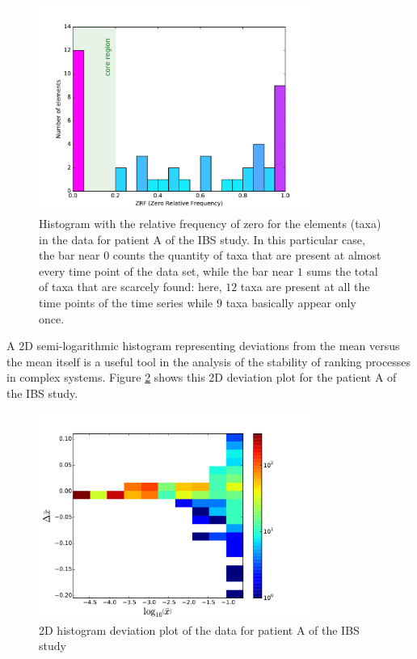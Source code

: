 \begin{figure}
	\centering
	\includegraphics[width=0.8\textwidth]{results/hist/IBS_h_A_amplicons_family_ZRFhist.pdf}
	\caption{Histogram with the relative frequency of zero for the elements (taxa) in the data for patient A of the IBS study\cite{IBS}. In this particular case, the bar near $0$ counts the quantity of taxa that are present at almost every time point of the data set, while the bar near $1$ sums the total of taxa that are scarcely found: here, $12$ taxa are present at all the time points of the time series while $9$ taxa basically appear only once.}
	\label{fig:histZRF}
\end{figure}

A 2D semi-logarithmic histogram representing deviations from the mean versus the mean itself is a useful tool in the analysis of the stability of ranking processes in complex systems\cite{ranking}. Figure \ref{fig:hist2D} shows this 2D deviation plot for the patient A of the IBS study\cite{IBS}.
 
\begin{figure}
	\centering
	\includegraphics[width=0.8\textwidth]{results/hist/IBS_h_A_amplicons_family_hist2D.pdf}
	\caption{2D histogram deviation plot of the data for patient A of the IBS study\cite{IBS}}
	\label{fig:hist2D}
\end{figure}


